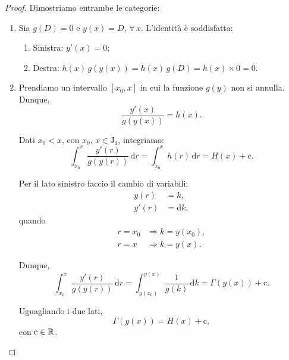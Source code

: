 \documentclass[../../dimostrazioni]{subfiles}
\begin{document}
        \begin{proof}
            Dimostriamo entrambe le categorie:
            \begin{enumerate}
                \item Sia \(g(D) = 0\) e \(y(x) = D\), \(\forall \, x\).
                    L'identità è soddisfatta:
                    \begin{enumerate}
                        \item Sinistra: \(y'(x) = 0\);
                        \item Destra: \(h(x) \, g(y(x)) = h(x) \, g(D) = h(x) \times 0 = 0\).
                    \end{enumerate}
                \item Prendiamo un intervallo \([x_0, x]\) in cui la funzione \(g(y)\) non si annulla. Dunque,
                    \[
                        \frac{y'(x)}{g(y(x))} = h(x).
                    \]

                    Dati \(x_0 < x\), con \(x_0, \, x \in \mathrm{J}_1\), integriamo:
                    \[
                        \int_{x_0}^{x} \! \frac{y'(r)}{g(y(r))} \, \mathrm{d}r = \int_{x_0}^{x} \! h(r) \, \mathrm{d}r = H(x) + \mathrm{c}.
                    \]

                    Per il lato sinistro faccio il cambio di variabili:
                    \begin{align*}
                        y(r) &= k,\\
                        y'(r) &= \mathrm{d}k,
                    \end{align*}
                    quando
                    \begin{align*}
                        r = x_0 &\Rightarrow k = y(x_0),\\
                        r = x &\Rightarrow k = y(x).
                    \end{align*}

                    Dunque,
                    \[
                        \int_{x_0}^{x} \! \frac{y'(r)}{g(y(r))} \, \mathrm{d}r = \int_{y(x_0)}^{y(x)} \! \frac{1}{g(k)} \, \mathrm{d}k = \Gamma(y(x)) + \mathrm{c}.
                    \]

                    Uguagliando i due lati,
                    \[
                        \Gamma(y(x)) = H(x) + \mathrm{c},
                    \]
                    con \(\mathrm{c} \in \mathbb{R}\).
            \end{enumerate}
        \end{proof}
            
\end{document}
